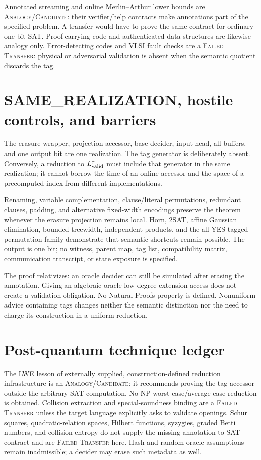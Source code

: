 \documentclass[11pt]{article}
\newcommand{\status}[1]{\textsc{#1}}
\begin{document}
Annotated streaming and online Merlin--Arthur lower bounds are
\status{Analogy/Candidate}: their verifier/help contracts make annotations
part of the specified problem.  A transfer would have to prove the same
contract for ordinary one-bit SAT.  Proof-carrying code and authenticated
data structures are likewise analogy only.  Error-detecting codes and VLSI
fault checks are a \status{Failed Transfer}: physical or adversarial
validation is absent when the semantic quotient discards the tag.

\section{SAME\_REALIZATION, hostile controls, and barriers}

The erasure wrapper, projection accessor, base decider, input head, all
buffers, and one output bit are one realization.  The tag generator is
deliberately absent.  Conversely, a reduction to $L_{\rm valid}^{\tau}$ must
include that generator in the same realization; it cannot borrow the time of
an online accessor and the space of a precomputed index from different
implementations.

Renaming, variable complementation, clause/literal permutations, redundant
clauses, padding, and alternative fixed-width encodings preserve the theorem
whenever the erasure projection remains local.  Horn, 2SAT, affine Gaussian
elimination, bounded treewidth, independent products, and the all-YES tagged
permutation family demonstrate that semantic shortcuts remain possible.
The output is one bit; no witness, parent map, tag list, compatibility matrix,
communication transcript, or state exposure is specified.

The proof relativizes: an oracle decider can still be simulated after erasing
the annotation.  Giving an algebraic oracle low-degree extension access does
not create a validation obligation.  No Natural-Proofs property is defined.
Nonuniform advice containing tags changes neither the semantic distinction
nor the need to charge its construction in a uniform reduction.

\section{Post-quantum technique ledger}

The LWE lesson of externally supplied, construction-defined reduction
infrastructure is an \status{Analogy/Candidate}: it recommends proving the
tag accessor outside the arbitrary SAT computation.  No NP
worst-case/average-case reduction is obtained.  Collision extraction and
special-soundness binding are a \status{Failed Transfer} unless the target
language explicitly asks to validate openings.  Schur squares,
quadratic-relation spaces, Hilbert functions, syzygies, graded Betti numbers,
and collision entropy do not supply the missing annotation-to-SAT contract
and are \status{Failed Transfer} here.  Hash and random-oracle assumptions
remain inadmissible; a decider may erase such metadata as well.
\end{document}
